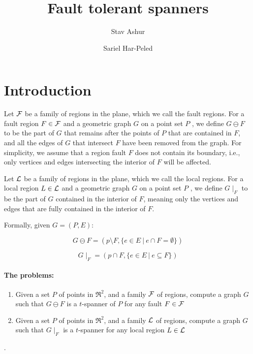 \documentclass[12pt]{article}%
\begin{document}
	
\title{Fault tolerant spanners}
\author{%
   Stav Ashur%
   \StavThanks{}%
   \and%
   Sariel Har-Peled%
}%
	
\maketitle
	
\section{Introduction}
	
Let $\mathcal{F}$ be a family of regions in the plane, which we call the fault
regions. For a fault region $F\in \mathcal{F}$ and a geometric graph $G$ on a
point set $P$ , we define $G\ominus F$ to be the part of $G$ that
remains after the points of $P$ that are contained in $F$, and all the
edges of $G$ that intersect $F$ have been removed from the graph. For
simplicity, we assume that a region fault $F$ does not contain its
boundary, i.e., only vertices and edges intersecting the interior of
$F$ will be affected.
	
	
Let $\mathcal{L}$ be a family of regions in the plane, which we call the local
regions. For a local region $L\in \mathcal{L}$ and a geometric graph $G$ on a
point set $P$ , we define $G\mid_F$ to be the part of $G$ contained in
the interior of $F$, meaning only the vertices and edges that are
fully contained in the interior of $F$.
	
Formally, given $G=(P,E)$:
	
$$G\ominus F = (p\setminus F, \{e\in E~|~ e\cap F = \emptyset\})$$

$$G\mid_F = (p \cap F, \{e\in E~|~ e\subseteq F\})$$
	
\paragraph{The problems:}

\begin{enumerate}
    \item Given a set $P$ of points in $\Re^2$, and a family $\mathcal{F}$ of
    regions, compute a graph $G$ such that $G\ominus F$ is a
    $t$-spanner of $P$ for any fault $F\in\mathcal{F}$
    \item Given a set $P$ of points in $\Re^2$, and a family $\mathcal{L}$ of
    regions, compute a graph $G$ such that $G\mid_F$ is a $t$-spanner
    for any local region $L\in\mathcal{L}$
\end{enumerate}
.
\end{document}
